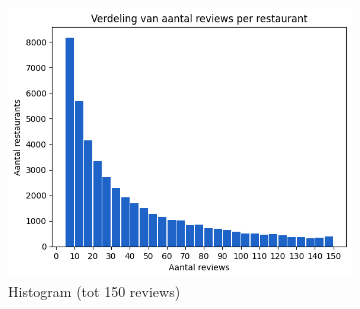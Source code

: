\begin{figure}[H]
    \begin{subfigure}{.7\textwidth}
        \centering
        \includegraphics[width=1\linewidth]{fig/chapt3/verdeling_aantal_reviews_per_restaurant.png}
        \caption{Histogram (tot 150 reviews)}
        \label{fig:chapt3_verdeling_aantal_reviews_per_restaurant}
    \end{subfigure}
    \begin{subfigure}{.25\textwidth}
        \centering

\end{subfigure}
\end{figure}
